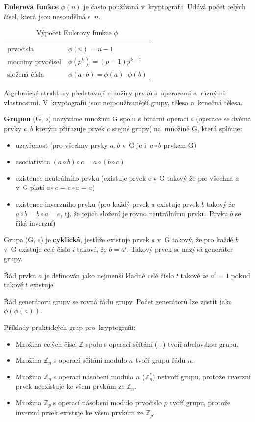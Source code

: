 \textbf{Eulerova funkce} $\phi(n)$ je často používaná v~kryptografii. Udává počet celých čísel, která jsou nesoudělná s~$n$.

\begin{table}[ht]
    \centering
    \caption{Výpočet Eulerovy funkce $\phi$}
    \begin{tabular}{l|l}
        prvočísla & $\phi(n) = n-1$ \\
        mocniny prvočísel & $\phi(p^k) = (p-1) p^{k-1}$ \\
        složená čísla & $\phi(a \cdot b) = \phi(a) \cdot \phi(b)$ \\
    \end{tabular}
\end{table}

Algebraické struktury představují množiny prvků s~operacemi a~různými vlastnostmi. V~kryptografii jsou nejpoužívanější grupy, tělesa a~konečná tělesa.

\textbf{Grupou} (G, $\circ$) nazýváme množinu G spolu s binární operací $\circ$ (operace se dvěma prvky $a, b$ kterým přiřazuje prvek $c$ stejné grupy) na~množině G, která splňuje:

\begin{itemize}[noitemsep]
    \item uzavřenost (pro všechny prvky $a, b$ v~G je i~$a \circ b$ prvkem G)
    \item asociativita $(a \circ b) \circ c = a \circ (b \circ c)$
    \item existence neutrálního prvku (existuje prvek e v G takový že pro všechna $a$ v~G platí $a \circ e = e \circ a = a$)
    \item existence inverzního prvku (pro každý prvek $a$ existuje prvek $b$ takový že $a \circ b = b \circ a = e$, tj. že jejich složení je rovno neutrálnímu prvku. Prvku $b$ se říká inverzní)
\end{itemize}

Grupa (G, $\circ$) je \textbf{cyklická}, jestliže existuje prvek $a$ v~G takový, že pro každé $b$ v~G existuje celé číslo $i$ takové, že $b = a^i$. Takový prvek se nazývá generátor grupy. 

Řád prvku $a$ je definován jako nejmenší kladné celé číslo $t$ takové že $a^t = 1$ pokud takové $t$ existuje. 

Řád generátoru grupy se rovná řádu grupy. Počet generátorů lze zjistit jako $\phi(\phi(n))$.

Příklady praktických grup pro~kryptografii:
\begin{itemize}[noitemsep]
    \item Množina celých čísel $\mathbb{Z}$ spolu s operací sčítání (+) tvoří abelovskou grupu.
    \item Množina $\mathbb{Z}_n$ s operací sčítání modulo $n$ tvoří grupu řádu $n$.
    \item Množina $\mathbb{Z}_n$ s operací násobení modulo $n$ ($\mathbb{Z}_n^*$) netvoří grupu, protože inverzní prvek neexistuje ke všem prvkům ze $\mathbb{Z}_n$.
    \item Množina $\mathbb{Z}_p$ s operací násobení modulo prvočíslo $p$ tvoří grupu, protože inverzní prvek existuje ke všem prvkům ze $\mathbb{Z}_p$. 
\end{itemize}

